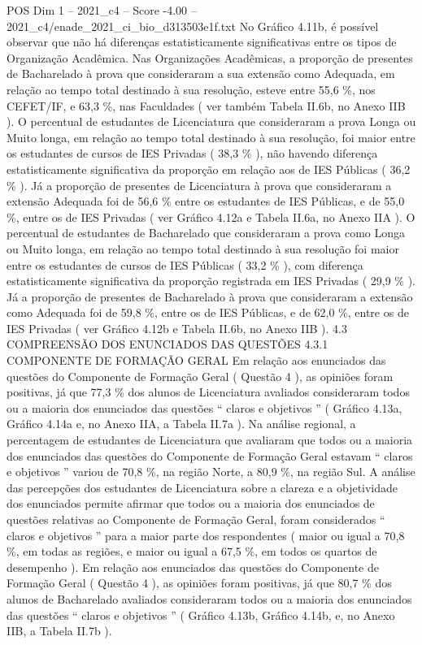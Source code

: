 \begin{textsample}{POS Dim 1 – 2021\_c4 – Score -4.00 – 2021\_c4/enade\_2021\_ci\_bio\_d313503e1f.txt}
No Gráfico 4.11b, é possível observar que não há diferenças estatisticamente significativas entre os tipos de Organização Acadêmica.
Nas Organizações Acadêmicas, a proporção de presentes de Bacharelado à prova que consideraram a sua extensão como Adequada, em relação ao tempo total destinado à sua resolução, esteve entre 55,6 \%, nos CEFET/IF, e 63,3 \%, nas Faculdades ( ver também Tabela II.6b, no Anexo IIB ).
O percentual de estudantes de Licenciatura que consideraram a prova Longa ou Muito longa, em relação ao tempo total destinado à sua resolução, foi maior entre os estudantes de cursos de IES Privadas ( 38,3 \% ), não havendo diferença estatisticamente significativa da proporção em relação aos de IES Públicas ( 36,2 \% ).
Já a proporção de presentes de Licenciatura à prova que consideraram a extensão Adequada foi de 56,6 \% entre os estudantes de IES Públicas, e de 55,0 \%, entre os de IES Privadas ( ver Gráfico 4.12a e Tabela II.6a, no Anexo IIA ).
O percentual de estudantes de Bacharelado que consideraram a prova como Longa ou Muito longa, em relação ao tempo total destinado à sua resolução foi maior entre os estudantes de cursos de IES Públicas ( 33,2 \% ), com diferença estatisticamente significativa da proporção registrada em IES Privadas ( 29,9 \% ).
Já a proporção de presentes de Bacharelado à prova que consideraram a extensão como Adequada foi de 59,8 \%, entre os de IES Públicas, e de 62,0 \%, entre os de IES Privadas ( ver Gráfico 4.12b e Tabela II.6b, no Anexo IIB ). 4.3 COMPREENSÃO DOS ENUNCIADOS DAS QUESTÕES 4.3.1 COMPONENTE DE FORMAÇÃO GERAL Em relação aos enunciados das questões do Componente de Formação Geral ( Questão 4 ), as opiniões foram positivas, já que 77,3 \% dos alunos de Licenciatura avaliados consideraram todos ou a maioria dos enunciados das questões “ claros e objetivos ” ( Gráfico 4.13a, Gráfico 4.14a e, no Anexo IIA, a Tabela II.7a ).
Na análise regional, a percentagem de estudantes de Licenciatura que avaliaram que todos ou a maioria dos enunciados das questões do Componente de Formação Geral estavam “ claros e objetivos ” variou de 70,8 \%, na região Norte, a 80,9 \%, na região Sul.
A análise das percepções dos estudantes de Licenciatura sobre a clareza e a objetividade dos enunciados permite afirmar que todos ou a maioria dos enunciados de questões relativas ao Componente de Formação Geral, foram considerados “ claros e objetivos ” para a maior parte dos respondentes ( maior ou igual a 70,8 \%, em todas as regiões, e maior ou igual a 67,5 \%, em todos os quartos de desempenho ).
Em relação aos enunciados das questões do Componente de Formação Geral ( Questão 4 ), as opiniões foram positivas, já que 80,7 \% dos alunos de Bacharelado avaliados consideraram todos ou a maioria dos enunciados das questões “ claros e objetivos ” ( Gráfico 4.13b, Gráfico 4.14b, e, no Anexo IIB, a Tabela II.7b ).

\end{textsample}
